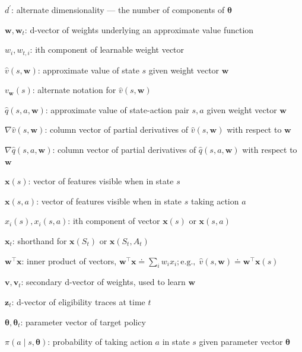 \documentclass{article}
\begin{document}
$d ^ { \prime }$: alternate dimensionality — the number of components of $\boldsymbol{\theta}$

$\mathbf { w } , \mathbf { w } _ { t }$: d-vector of weights underlying an approximate value function

$w _ { i } , w _ { t , i }$: ith component of learnable weight vector

$\hat { v } ( s , \mathbf { w } )$: approximate value of state $s$ given weight vector $\mathbf { w }$

$v _ { \mathbf { w } } ( s )$: alternate notation for $\hat { v } ( s , \mathbf { w } )$

$\hat { q } ( s , a , \mathbf { w } )$: approximate value of state-action pair $s , a$ given weight vector $\mathbf { w }$

$\nabla \hat { v } ( s , \mathbf { w } )$: column vector of partial derivatives of $\hat { v } ( s , \mathbf { w } )$ with respect to $\mathbf { w }$

$\nabla \hat { q } ( s , a , \mathbf { w } )$: column vector of partial derivatives of $\hat { q } ( s , a , \mathbf { w } )$ with respect to $\mathbf { w }$

$\mathbf { x } ( s )$: vector of features visible when in state $s$

$\mathbf { x } ( s , a )$: vector of features visible when in state $s$ taking action $a$

$x _ { i } ( s ) , x _ { i } ( s , a )$: ith component of vector $\mathbf { x } ( s )$ or $\mathbf { x } ( s , a )$

$\mathbf { x } _ { t }$: shorthand for $\mathbf { x } ( S _ { t } )$ or $\mathbf { x } ( S _ { t } , A _ { t } )$

$\mathbf { w } ^ { \top } \mathbf { x }$: inner product of vectors, $\mathbf { w } ^ { \top } \mathbf { x } \doteq \sum _ { i } w _ { i } x _ { i } ; \mathrm { e . g . , } \; \hat { v } ( s \mathbf { , } \mathbf { w } ) \doteq \mathbf { w } ^ { \top } \mathbf { x } ( s )$

$\mathbf { v } , \mathbf { v } _ { t }$: secondary d-vector of weights, used to learn $\mathbf { w }$

$\mathbf { z } _ { t }$: d-vector of eligibility traces at time $t$

$\boldsymbol{\theta}, \boldsymbol{\theta}_t$: parameter vector of target policy

$\pi ( a \mid s , \boldsymbol { \theta } )$: probability of taking action $a$ in state $s$ given parameter vector $\boldsymbol { \theta }$
\end{document}
